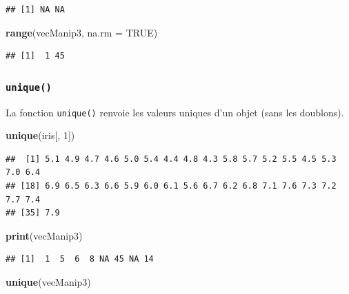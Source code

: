 \documentclass[]{book}
\newenvironment{Shaded}{\begin{snugshade}}{\end{snugshade}}
\newcommand{\DataTypeTok}[1]{\textcolor[rgb]{0.13,0.29,0.53}{#1}}
\newcommand{\DecValTok}[1]{\textcolor[rgb]{0.00,0.00,0.81}{#1}}
\newcommand{\KeywordTok}[1]{\textcolor[rgb]{0.13,0.29,0.53}{\textbf{#1}}}
\newcommand{\NormalTok}[1]{#1}
\newcommand{\OtherTok}[1]{\textcolor[rgb]{0.56,0.35,0.01}{#1}}
\begin{document}
\begin{verbatim}
## [1] NA NA
\end{verbatim}

\begin{Shaded}
\begin{Highlighting}[]
\KeywordTok{range}\NormalTok{(vecManip3, }\DataTypeTok{na.rm =} \OtherTok{TRUE}\NormalTok{)}
\end{Highlighting}
\end{Shaded}

\begin{verbatim}
## [1]  1 45
\end{verbatim}

\hypertarget{l015unique}{%
\subsubsection{\texorpdfstring{\texttt{unique()}}{unique()}}\label{l015unique}}

La fonction \texttt{unique()} renvoie les valeurs uniques d'un objet (sans les doublons).

\begin{Shaded}
\begin{Highlighting}[]
\KeywordTok{unique}\NormalTok{(iris[, }\DecValTok{1}\NormalTok{])}
\end{Highlighting}
\end{Shaded}

\begin{verbatim}
##  [1] 5.1 4.9 4.7 4.6 5.0 5.4 4.4 4.8 4.3 5.8 5.7 5.2 5.5 4.5 5.3 7.0 6.4
## [18] 6.9 6.5 6.3 6.6 5.9 6.0 6.1 5.6 6.7 6.2 6.8 7.1 7.6 7.3 7.2 7.7 7.4
## [35] 7.9
\end{verbatim}

\begin{Shaded}
\begin{Highlighting}[]
\KeywordTok{print}\NormalTok{(vecManip3)}
\end{Highlighting}
\end{Shaded}

\begin{verbatim}
## [1]  1  5  6  8 NA 45 NA 14
\end{verbatim}

\begin{Shaded}
\begin{Highlighting}[]
\KeywordTok{unique}\NormalTok{(vecManip3)}
\end{Highlighting}
\end{Shaded}
\end{document}
